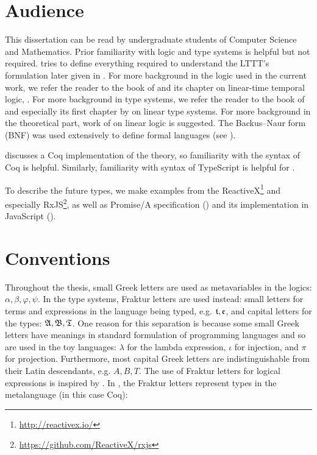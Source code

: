 \section{Audience}

This dissertation can be read by undergraduate students of Computer Science and Mathematics.
Prior familiarity with logic and type systems is helpful but not required.  tries to define everything required to understand the LTTT's formulation later given in . For more background in the logic used in the current work, we refer the reader to the book of \cite{ben-ari2012book} and its chapter on linear-time temporal logic, \cite{Ben-Ari2012}. For more background in type systems, we refer the reader to the book of \cite{10.5555/1076265} and especially its first chapter by \cite{DavidWalker2004} on linear type systems.
For more background in the theoretical part, work of \cite{DBLP:journals/tcs/Girard87} on linear logic is suggested.
The Backus--Naur form (BNF) was used extensively to define formal languages (see \cite{DBLP:conf/ifip/Backus59}).

 discusses a Coq implementation of the theory, so familiarity with the syntax of Coq is helpful. Similarly, familiarity with syntax of TypeScript is helpful for .

To describe the future types, we make examples from the ReactiveX\footnote{\url{http://reactivex.io/}} and especially RxJS\footnote{\url{https://github.com/ReactiveX/rxjs}}, as well as Promise/A specification (\cite{zyp_2010}) and its implementation in JavaScript (\cite{bershanskiy_mills_willee_ribaric_2020}).

\section{Conventions}

Throughout the thesis, small Greek letters are used as metavariables in the logics: $\alpha, \beta, \varphi, \psi$. In the type systems, Fraktur letters are used instead: small letters for terms and expressions in the language being typed, e.g. $\mathfrak{t}, \mathfrak{e}$, and capital letters for the types: $\mathfrak{A}, \mathfrak{B}, \mathfrak{T}$. One reason for this separation is because some small Greek letters have meanings in standard formulation of programming languages and so are used in the toy languages: $\lambda$ for the lambda expression, $\iota$ for injection, and $\pi$ for projection. Furthermore, most capital Greek letters are indistinguishable from their Latin descendants, e.g. $A, B, T$. The use of Fraktur letters for logical expressions is inspired by \cite{hilbert1928}.
In , the Fraktur letters represent types in the metalanguage (in this case Coq):


